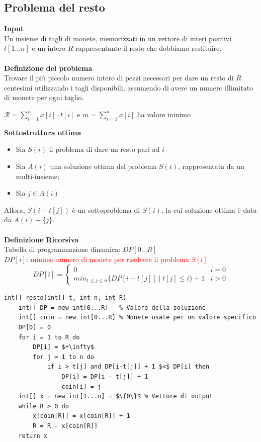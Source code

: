 \documentclass[../cheatSheetAlgoritmi.tex]{subfiles}
\begin{document}
\subsection{Problema del resto}
\textbf{Input}\\
Un insieme di tagli di monete, memorizzati in un vettore di interi positivi $t[1...n]$ e un intero $R$ rappresentante il resto che dobbiamo restituire.\\\\
\textbf{Definizione del problema}\\
Trovare il più piccolo numero intero di pezzi necessari per dare un resto di $R$ centesimi utilizzando i tagli disponibili, assumendo di avere un numero illimitato di monete per ogni taglio.
\begin{center}
	$\mathcal{R} = \sum_{i=1}^{n} x[i] \cdot t[i]$ e $m = \sum_{i = 1}^{n} x[i]$ ha valore minimo
\end{center}
\textbf{Sottostruttura ottima}
\begin{itemize}
	\item Sia $S(i)$ il problema di dare un resto pari ad $i$
	\item Sia $A(i)$ una soluzione ottima del problema $S(i)$, rappresentata da un multi-insieme; 
	\item Sia $j \in A(i)$
\end{itemize}
Allora, $S(i - t[j])$ è un sottoproblema di $S(i)$, la cui soluzione ottima è data da $A(i) - \{j\}$.\\\\
\textbf{Definizione Ricorsiva}\\
Tabella di programmazione dinamica: $DP[0...R]$\\
$DP[i]$: \textcolor{red}{minimo numero di monete per risolvere il problema $S[i]$}\\
\begin{equation*}
  	DP[i]=\begin{cases}
   		0  & \text{$i = 0$}\\
   		min_{1 \leq j \leq n}\{DP[i - t[j]] \mid t[j] \leq i\} + 1 & \text{$i > 0$}
  	\end{cases}
\end{equation*}
\begin{lstlisting}[caption=Resto (DP)]
int[] resto(int[] t, int n, int R)
	int[] DP = new int[0...R] 	% Valore della soluzione
	int[] coin = new int[0...R]	% Monete usate per un valore specifico
	DP[0] = 0
	for i = 1 to R do
		DP[i] = $+\infty$
		for j = 1 to n do
			if i > t[j] and DP[i-t[j]] + 1 $<$ DP[i] then
				DP[i] = DP[i - t[j]] + 1
				coin[i] = j
	int[] x = new int[1...n] = $\{0\}$ % Vettore di output
	while R > 0 do
		x[coin[R]] = x[coin[R]] + 1
		R = R - x[coin[R]]
	return x
\end{lstlisting}
\end{document}
